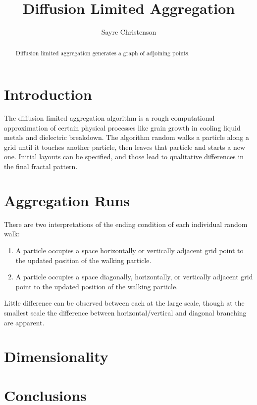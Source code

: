 \documentclass[12pt]{article}
\begin{document}
\title{Diffusion Limited Aggregation}
\date{}
\author{Sayre Christenson}

\maketitle


\begin{abstract}

Diffusion limited aggregation generates a graph of adjoining points.


\end{abstract}

\section*{Introduction}

The diffusion limited aggregation algorithm is a rough computational approximation of certain physical processes like grain growth in cooling liquid metals and dielectric breakdown.
The algorithm random walks a particle along a grid until it touches another particle, then leaves that particle and starts a new one.
Initial layouts can be specified, and those lead to qualitative differences in the final fractal pattern.


\section*{Aggregation Runs}

There are two interpretations of the ending condition of each individual random walk:

\begin{enumerate}
\item{A particle occupies a space horizontally or vertically adjacent grid point to the updated position of the walking particle.}
\item{A particle occupies a space diagonally, horizontally, or vertically adjacent grid point to the updated position of the walking particle.}
\end{enumerate}

Little difference can be observed between each at the large scale, though at the smallest scale the difference between horizontal/vertical and diagonal branching are apparent.



\section*{Dimensionality}


\section*{Conclusions}
\end{document}
